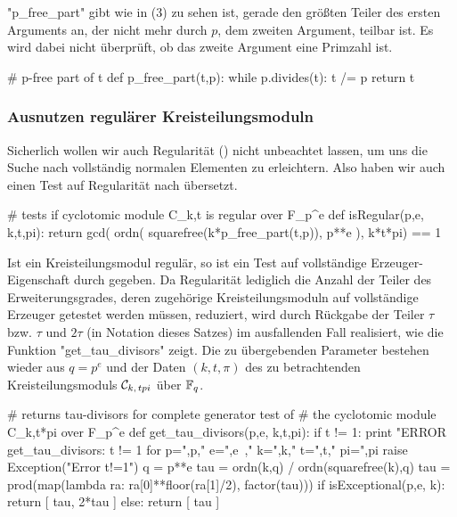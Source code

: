 "p_free_part" gibt wie in  (3) zu sehen ist,
gerade den größten Teiler des ersten Arguments an, der nicht mehr durch $p$,
dem zweiten Argument, teilbar ist. Es wird dabei nicht überprüft, ob das zweite
Argument eine Primzahl ist.


\begin{sagecode}[caption={Aus \url{../Sage/enumeratePCNs.spyx}},
  firstnumber=612]
# p-free part of t
def p_free_part(t,p):
    while p.divides(t):
        t /= p
    return t
\end{sagecode}




\subsubsection{Ausnutzen regulärer Kreisteilungsmoduln}

Sicherlich wollen wir auch Regularität () nicht unbeachtet
lassen, um uns die Suche nach vollständig normalen Elementen zu erleichtern.
Also haben wir auch einen Test auf Regularität nach \sage übersetzt.

\begin{sagecode}[caption={Aus \url{../Sage/enumeratePCNs.spyx}},
  firstnumber=431]
# tests if cyclotomic module C_k,t is regular over F_p^e
def isRegular(p,e, k,t,pi):
    return gcd( ordn( squarefree(k*p_free_part(t,p)), p**e ),  k*t*pi) == 1
\end{sagecode}

Ist ein Kreisteilungsmodul regulär, so ist ein Test auf vollständige
Erzeuger-Eigenschaft durch  gegeben.
Da Regularität lediglich die Anzahl der Teiler des Erweiterungsgrades, deren
zugehörige Kreisteilungsmoduln auf vollständige Erzeuger getestet werden
müssen, reduziert, wird  durch Rückgabe der
Teiler $\tau$ bzw. $\tau$ und $2\tau$ (in Notation dieses Satzes)
im ausfallenden Fall realisiert, wie die Funktion 
"get_tau_divisors" zeigt. Die zu übergebenden Parameter bestehen wieder aus 
$q = p^e$ und der Daten $(k,t,\pi)$ des zu betrachtenden Kreisteilungsmoduls 
$\mathcal{C}_{k,\,tpi}$ über $\mathbb{F}_q$.

\begin{sagecode}[caption={Aus \url{../Sage/enumeratePCNs.spyx}},
  firstnumber=436]
# returns tau-divisors for complete generator test of 
# the cyclotomic module C_k,t*pi over F_p^e
def get_tau_divisors(p,e, k,t,pi):
    if t != 1:
        print "ERROR get_tau_divisors: t != 1 for p=",p," e=",e\
                ," k=",k," t=",t," pi=",pi
        raise Exception("Error t!=1")
    q = p**e
    tau = ordn(k,q) / ordn(squarefree(k),q)
    tau = prod(map(lambda ra: ra[0]**floor(ra[1]/2), factor(tau)))
    if isExceptional(p,e, k):
        return [ tau, 2*tau ]
    else:
        return [ tau ]
\end{sagecode}

